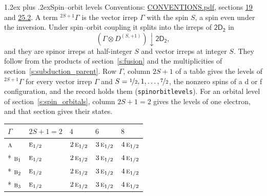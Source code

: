 \documentclass[10pt,a4paper]{article}
\makeatletter
\renewcommand\section{\@startsection{section}{1}{\z@}{-3ex plus -1ex minus -.2ex}%
  {1.2ex plus .2ex}{\normalfont\large\sffamily\bfseries\color{parttitle}}}
\numberwithin{equation}{section}
\newcommand{\grp}[1]{\mathsf{#1}}
\newcommand{\irr}[1]{\text{\normalfont\scshape #1}}
\newcommand{\restr}[2]{#1\!\downarrow#2}
\newcommand{\irrJp}[2]{D^{(#1,#2)}}
\newcommand{\irrprod}{\otimes}
\newcommand{\term}[2]{{}^{#1}#2}
\makeatother
\begin{document}
\section{Spin--orbit levels}\label{s:spin_orbit}
Conventions: \href{../../CONVENTIONS.pdf}{CONVENTIONS.pdf}, sections \href{../../../rotation/CONVENTIONS.pdf\#conv.19}{19} and \href{../../CONVENTIONS.pdf\#conv.25.2}{25.2}.
\leavevmode\label{n:local.spin}\label{n:symbol.term}A term $\term{2S+1}{\Gamma}$ is the vector irrep $\Gamma$ with the spin $S$, a spin even under the inversion. Under spin--orbit coupling it splits into the irreps of $\grp{2D_{2}}$ in
\begin{equation}\label{e:spinorbit}\restr{(\Gamma \irrprod \irrJp{S}{+1})}{\grp{2D_{2}}},\end{equation}
and they are spinor irreps at half-integer $S$ and vector irreps at integer $S$. They follow from the products of section~\ref{s:fusion} and the multiplicities of section~\ref{s:subduction_parent}. Row $\Gamma$, column $2S + 1$ of a table gives the levels of $\term{2S+1}{\Gamma}$ for every vector irrep $\Gamma$ and $S = \nicefrac{1}{2}, 1, \dots, \nicefrac{7}{2}$, the nonzero spins of a d or f configuration, and the record holds them (\texttt{spinorbitlevels}). For an orbital level of section~\ref{s:spin_orbitals}, column $2S + 1 = 2$ gives the levels of one electron, and that section gives their states.
{\small\setlength{\tabcolsep}{3pt}\begin{longtable}{@{}lllll@{}}\toprule
$\Gamma$ & $2S + 1 = 2$ & $4$ & $6$ & $8$\\\midrule\endhead
\bottomrule\endfoot\endlastfoot
$\irr{a}$ & $\irr{e}_{1/2}$ & $2\,\irr{e}_{1/2}$ & $3\,\irr{e}_{1/2}$ & $4\,\irr{e}_{1/2}$\\*
$\irr{b}_{1}$ & $\irr{e}_{1/2}$ & $2\,\irr{e}_{1/2}$ & $3\,\irr{e}_{1/2}$ & $4\,\irr{e}_{1/2}$\\*
$\irr{b}_{2}$ & $\irr{e}_{1/2}$ & $2\,\irr{e}_{1/2}$ & $3\,\irr{e}_{1/2}$ & $4\,\irr{e}_{1/2}$\\*
$\irr{b}_{3}$ & $\irr{e}_{1/2}$ & $2\,\irr{e}_{1/2}$ & $3\,\irr{e}_{1/2}$ & $4\,\irr{e}_{1/2}$\\
\bottomrule\end{longtable}}
\end{document}
